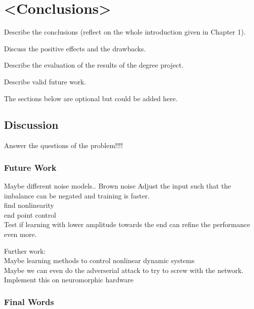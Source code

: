 \chapter{<Conclusions>}
Describe the conclusions (reflect on the whole introduction given in Chapter 1).

Discuss the positive effects and the drawbacks.

Describe the evaluation of the results of the degree project.

Describe valid future work.

The sections below are optional but could be added here.

\section{Discussion}

Answer the questions of the problem!!!!\\

\subsection{Future Work}

Maybe different noise models.. Brown noise
Adjust the input such that the imbalance can be negated and training is faster.\\
find nonlinearity\\
end point control\\
Test if learning with lower amplitude towards the end can refine the performance even more.\\

Further work:\\
Maybe learning methods to control nonlinear dynamic systems\\
Maybe we can even do the adverserial attack to try to screw with the network.\\
Implement this on neuromorphic hardware\\

\subsection{Final Words}

\listoftodos






